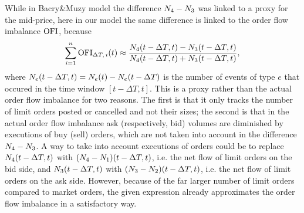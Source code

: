 \documentclass[10pt, article,table]{article}
\begin{document}
While in Bacry\&Muzy model the difference $\countingProc[4] - \countingProc[3]$ was linked to a proxy for the mid-price, here in our model the same difference is linked to the order flow imbalance $\orderFlowImbalance$, because 
\begin{equation*}
 \sum_{i=1}^{n}\orderFlowImbalance_{\Delta T, \, i}(t) \approx  \frac{\countingProc[4](t-\Delta T,t)-\countingProc[3](t-\Delta T,t)}{\countingProc[4](t-\Delta T,t) + \countingProc[3](t-\Delta T,t)},
\end{equation*}
where $\countingProc(t-\Delta T, t) = \countingProc(t) - \countingProc(t-\Delta T)$ is the number of  events of type $e$ that occured in the time window $[t-\Delta T, t]$. This is a proxy rather than the actual order flow imbalance for two reasons. The first is that it only tracks the number of limit orders posted or cancelled and not their sizes; the second is that  in the actual order flow imbalance ask (respectively, bid) volumes are diminished by executions of buy (sell) orders, which are not taken into account in the difference $\countingProc[4] - \countingProc[3]$. A way to take into account executions of orders could be to replace $\countingProc[4](t-\Delta T, t)$ with $(\countingProc[4]-\countingProc[1])(t-\Delta T, t)$, i.e.  the net flow of limit orders on the bid side, and $\countingProc[3](t-\Delta T, t)$ with $(\countingProc[3]-\countingProc[2])(t-\Delta T, t)$, i.e.  the net flow of limit orders on the ask side. However, because of the far larger number of limit orders compared to market orders, the given expression already approximates the order flow imbalance in a satisfactory way. 
\end{document}
